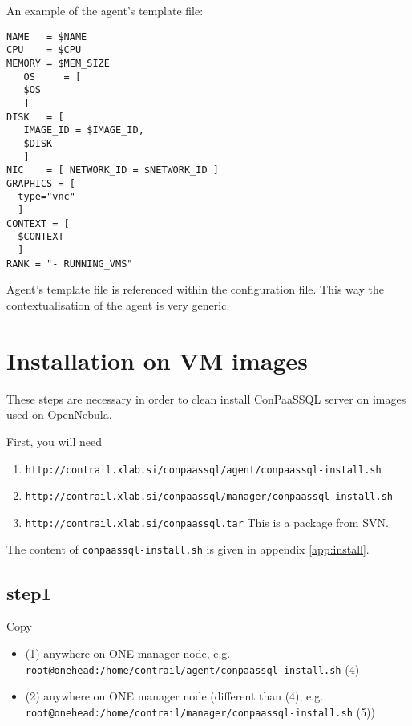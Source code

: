 \documentclass[a4paper,10pt]{article}
\begin{document}
An example of the agent's template file:

\begin{Verbatim}[frame=single]
NAME   = $NAME
CPU    = $CPU
MEMORY = $MEM_SIZE
   OS     = [
   $OS 
   ]
DISK   = [
   IMAGE_ID = $IMAGE_ID,
   $DISK 
   ]
NIC    = [ NETWORK_ID = $NETWORK_ID ]
GRAPHICS = [
  type="vnc"
  ]
CONTEXT = [
  $CONTEXT   
  ]
RANK = "- RUNNING_VMS"
\end{Verbatim}

Agent's template file is referenced within the configuration file. This way the contextualisation of the agent is very generic. 

\section{Installation on VM images}
\label{sec:install}

These steps are necessary in order to clean install ConPaaSSQL server on images used on OpenNebula.

First, you will need
\begin{enumerate}
\item {\tt http://contrail.xlab.si/conpaassql/agent/conpaassql-install.sh}
\item {\tt http://contrail.xlab.si/conpaassql/manager/conpaassql-install.sh}
\item {\tt http://contrail.xlab.si/conpaassql.tar} This is a package from SVN.
\end{enumerate}


The content of {\tt conpaassql-install.sh} is given in appendix \ref{app:install}.

\subsection*{step1}

Copy
\begin{itemize}
\item (1) anywhere on ONE manager node, e.g. \\ {\tt root@onehead:/home/contrail/agent/conpaassql-install.sh} (4)
\item (2) anywhere on ONE manager node (different than (4), e.g. \\ {\tt root@onehead:/home/contrail/manager/conpaassql-install.sh} (5))
\end{itemize}
\end{document}
